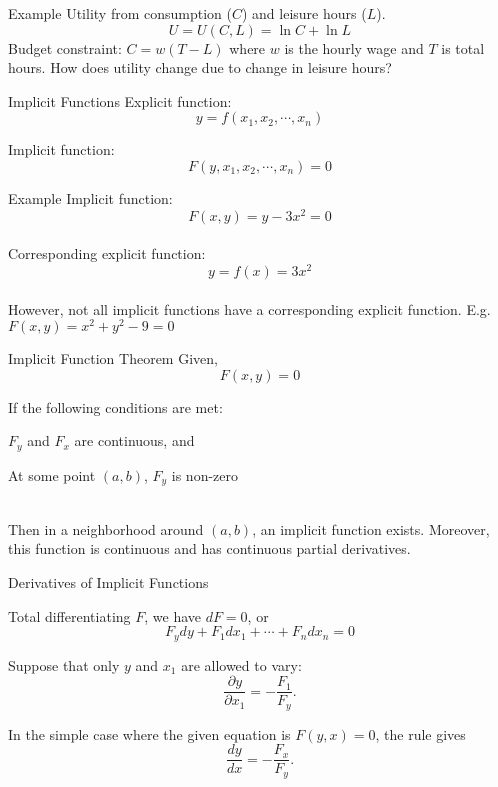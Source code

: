\documentclass{./../../Latex/teaching_slides}
\begin{document}
\begin{frame}{Example}
Utility from consumption ($C$) and leisure hours ($L$).
$$ U = U(C,L) = \ln C + \ln L $$
Budget constraint:
$ C = w (T-L) $
where $w$ is the hourly wage and $T$ is total hours. How does utility change due to change in leisure hours?
\end{frame}

\begin{frame}{Implicit Functions}
Explicit function:
$$y=f\left(x_{1}, x_{2}, \cdots, x_{n}\right)$$

\vspace{1cm}
Implicit function:
\[F\left(y, x_{1}, x_{2}, \cdots, x_{n}\right)=0\]
\end{frame}

\begin{frame}{Example}
Implicit function:
\[ F(x,y)=y-3x^2 =0 \] \\ \vspace{1em}
Corresponding explicit function:
$$ y = f(x) = 3x^2 $$ \\ \vspace{1em}
However, not all implicit functions have a corresponding explicit function. E.g. $F(x,y) = x^2 + y^2 -9=0$
\end{frame}


\begin{frame}{Implicit Function Theorem}
Given,
\[F\left(x, y \right)=0\]

\vspace{1em}
If the following conditions are met: \\ \vspace{0.5em}
\begin{witemize}
  \item $F_y$ and $F_x$ are continuous, and
  \item At some point $(a,b)$, $F_y$ is non-zero  \\~\\
\end{witemize}
Then in a neighborhood around $(a,b)$, an implicit function exists. Moreover, this function is continuous and has continuous partial derivatives. 
\end{frame}

\begin{frame}{Derivatives of Implicit Functions}

Total differentiating $F$, we have $d F=0$, or
$$
F_{y} d y+F_{1} d x_{1}+\cdots+F_{n} d x_{n}=0 
$$

\vspace{1em}
Suppose that only $y$ and $x_{1}$ are allowed to vary:
$$
\frac{\partial y}{\partial x_{1}}=-\frac{F_{1}}{F_{y}} .
$$

\vspace{1em}
In the simple case where the given equation is $F(y, x)=0$, the rule gives
$$
\frac{d y}{d x}=-\frac{F_{x}}{F_{y}} .
$$
\end{frame}
\end{document}
